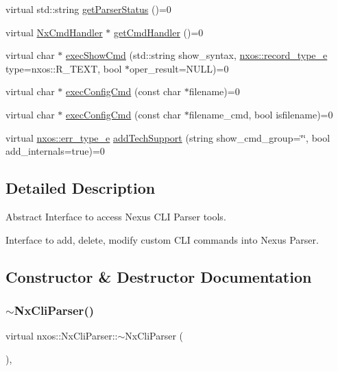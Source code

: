 \begin{DoxyCompactItemize}
virtual std\+::string \mbox{\hyperlink{classnxos_1_1_nx_cli_parser_a5a6839c678451ecbb78449df6960cf8c}{get\+Parser\+Status}} ()=0
\item 
virtual \mbox{\hyperlink{classnxos_1_1_nx_cmd_handler}{Nx\+Cmd\+Handler}} $\ast$ \mbox{\hyperlink{classnxos_1_1_nx_cli_parser_af058955d7c6dae444a5dab084342d03c}{get\+Cmd\+Handler}} ()=0
\item 
virtual char $\ast$ \mbox{\hyperlink{classnxos_1_1_nx_cli_parser_a44b08502fa02c0f83b9dc26ef02e2be8}{exec\+Show\+Cmd}} (std\+::string show\+\_\+syntax, \mbox{\hyperlink{nx__common_8h_a8952d5a318ed66cef9c7a83c7fd3ae91}{nxos\+::record\+\_\+type\+\_\+e}} type=nxos\+::\+R\+\_\+\+T\+E\+XT, bool $\ast$oper\+\_\+result=N\+U\+LL)=0
\item 
virtual char $\ast$ \mbox{\hyperlink{classnxos_1_1_nx_cli_parser_aa22ee0395ceadc46a3e28b93c5a5b75e}{exec\+Config\+Cmd}} (const char $\ast$filename)=0
\item 
virtual char $\ast$ \mbox{\hyperlink{classnxos_1_1_nx_cli_parser_a82767646d23e67dd7e62740587a368ea}{exec\+Config\+Cmd}} (const char $\ast$filename\+\_\+cmd, bool isfilename)=0
\item 
virtual \mbox{\hyperlink{nx__exception_8h_ab37a154d6e66b6fabe61025ba9f523e1}{nxos\+::err\+\_\+type\+\_\+e}} \mbox{\hyperlink{classnxos_1_1_nx_cli_parser_a80f0361d21af2b7b45a72a9144394968}{add\+Tech\+Support}} (string show\+\_\+cmd\+\_\+group=\char`\"{}\char`\"{}, bool add\+\_\+internals=true)=0
\end{DoxyCompactItemize}


\subsection{Detailed Description}
Abstract Interface to access Nexus C\+LI Parser tools. 

Interface to add, delete, modify custom C\+LI commands into Nexus Parser. 

\subsection{Constructor \& Destructor Documentation}
\mbox{\label{classnxos_1_1_nx_cli_parser_ae7d5ada6ff25efd19ba95161fa60eeac}} 
\subsubsection{\texorpdfstring{$\sim$\+Nx\+Cli\+Parser()}{~NxCliParser()}}
{\footnotesize\ttfamily virtual nxos\+::\+Nx\+Cli\+Parser\+::$\sim$\+Nx\+Cli\+Parser (\begin{DoxyParamCaption}{ }\end{DoxyParamCaption})\hspace{0.3cm}{\ttfamily [inline]}, {\ttfamily [virtual]}}

